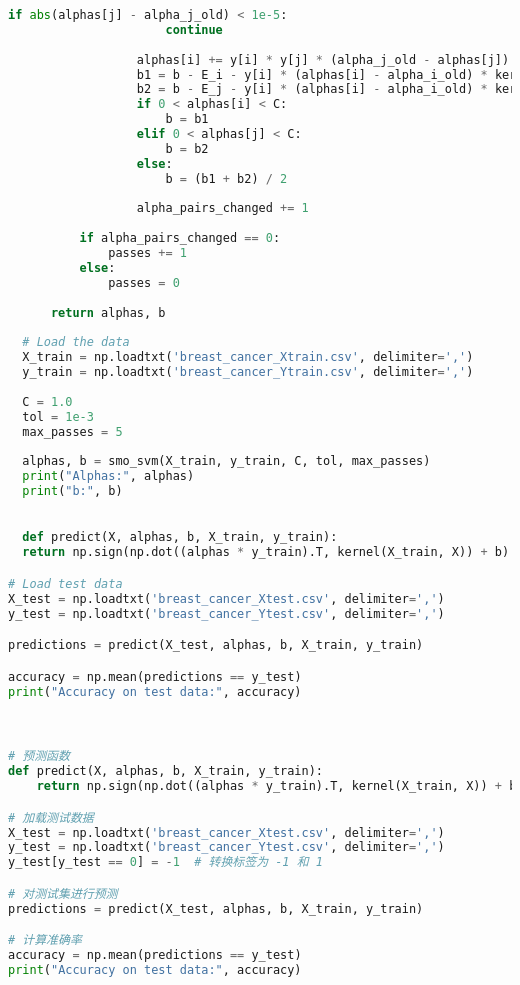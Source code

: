 \documentclass[12pt]{article}
\begin{document}
\begin{lstlisting}[language=Python]
                  if abs(alphas[j] - alpha_j_old) < 1e-5:
                      continue
  
                  alphas[i] += y[i] * y[j] * (alpha_j_old - alphas[j])
                  b1 = b - E_i - y[i] * (alphas[i] - alpha_i_old) * kernel(X[i], X[i]) - y[j] * (alphas[j] - alpha_j_old) * kernel(X[i], X[j])
                  b2 = b - E_j - y[i] * (alphas[i] - alpha_i_old) * kernel(X[i], X[j]) - y[j] * (alphas[j] - alpha_j_old) * kernel(X[j], X[j])
                  if 0 < alphas[i] < C:
                      b = b1
                  elif 0 < alphas[j] < C:
                      b = b2
                  else:
                      b = (b1 + b2) / 2
  
                  alpha_pairs_changed += 1
  
          if alpha_pairs_changed == 0:
              passes += 1
          else:
              passes = 0
  
      return alphas, b
  
  # Load the data
  X_train = np.loadtxt('breast_cancer_Xtrain.csv', delimiter=',')
  y_train = np.loadtxt('breast_cancer_Ytrain.csv', delimiter=',')
  
  C = 1.0
  tol = 1e-3
  max_passes = 5
  
  alphas, b = smo_svm(X_train, y_train, C, tol, max_passes)
  print("Alphas:", alphas)
  print("b:", b)

  
  def predict(X, alphas, b, X_train, y_train):
  return np.sign(np.dot((alphas * y_train).T, kernel(X_train, X)) + b)

# Load test data
X_test = np.loadtxt('breast_cancer_Xtest.csv', delimiter=',')
y_test = np.loadtxt('breast_cancer_Ytest.csv', delimiter=',')

predictions = predict(X_test, alphas, b, X_train, y_train)

accuracy = np.mean(predictions == y_test)
print("Accuracy on test data:", accuracy)



# 预测函数
def predict(X, alphas, b, X_train, y_train):
    return np.sign(np.dot((alphas * y_train).T, kernel(X_train, X)) + b)

# 加载测试数据
X_test = np.loadtxt('breast_cancer_Xtest.csv', delimiter=',')
y_test = np.loadtxt('breast_cancer_Ytest.csv', delimiter=',')
y_test[y_test == 0] = -1  # 转换标签为 -1 和 1

# 对测试集进行预测
predictions = predict(X_test, alphas, b, X_train, y_train)

# 计算准确率
accuracy = np.mean(predictions == y_test)
print("Accuracy on test data:", accuracy)


\end{lstlisting}
\end{document}
